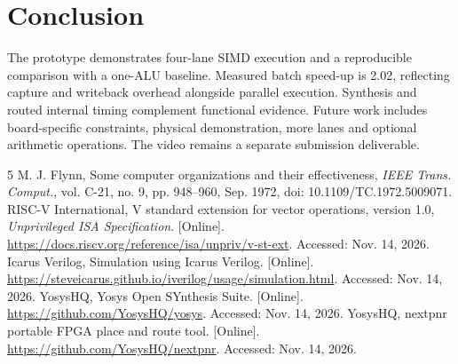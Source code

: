 \documentclass[conference]{IEEEtran}
\begin{document}
\section{Conclusion}
The prototype demonstrates four-lane SIMD execution and a reproducible comparison with a one-ALU baseline. Measured batch speed-up is 2.02, reflecting capture and writeback overhead alongside parallel execution. Synthesis and routed internal timing complement functional evidence. Future work includes board-specific constraints, physical demonstration, more lanes and optional arithmetic operations. The video remains a separate submission deliverable.

\begin{thebibliography}{5}
 M. J. Flynn, Some computer organizations and their effectiveness, \emph{IEEE Trans. Comput.}, vol. C-21, no. 9, pp. 948--960, Sep. 1972, doi: 10.1109/TC.1972.5009071.
 RISC-V International, V standard extension for vector operations, version 1.0, \emph{Unprivileged ISA Specification}. [Online]. \url{https://docs.riscv.org/reference/isa/unpriv/v-st-ext}. Accessed: Nov. 14, 2026.
 Icarus Verilog, Simulation using Icarus Verilog. [Online]. \url{https://steveicarus.github.io/iverilog/usage/simulation.html}. Accessed: Nov. 14, 2026.
 YosysHQ, Yosys Open SYnthesis Suite. [Online]. \url{https://github.com/YosysHQ/yosys}. Accessed: Nov. 14, 2026.
 YosysHQ, nextpnr portable FPGA place and route tool. [Online]. \url{https://github.com/YosysHQ/nextpnr}. Accessed: Nov. 14, 2026.
\end{thebibliography}
\end{document}
